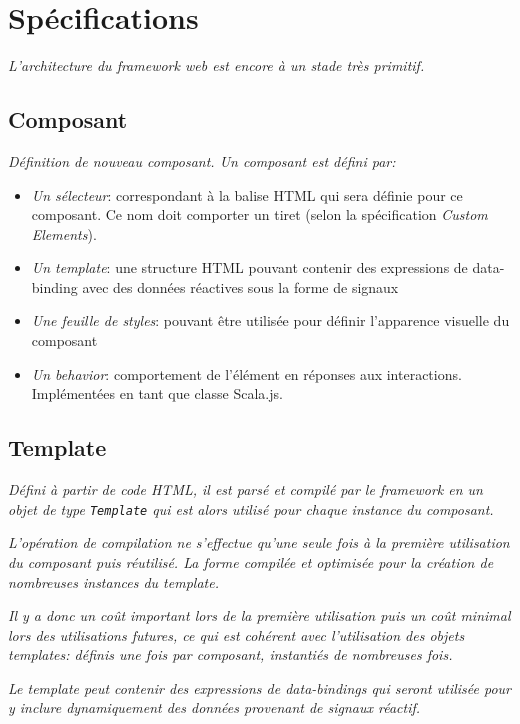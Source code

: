 \section{Spécifications} \label{sec:web-specs}

\textit{L'architecture du framework web est encore à un stade très primitif.}

\subsection{Composant}
\textit{Définition de nouveau composant. Un composant est défini par:}
\begin{itemize}
	\item \emph{Un sélecteur}: correspondant à la balise HTML qui sera définie pour ce composant. Ce nom doit comporter un tiret (selon la spécification \emph{Custom Elements}).
	\item \emph{Un template}: une structure HTML pouvant contenir des expressions de data-binding avec des données réactives sous la forme de signaux
	\item \emph{Une feuille de styles}: pouvant être utilisée pour définir l'apparence visuelle du composant
	\item \emph{Un behavior}: comportement de l'élément en réponses aux interactions. Implémentées en tant que classe Scala.js.
\end{itemize}

\subsection{Template}
\textit{Défini à partir de code HTML, il est parsé et compilé par le framework en un objet de type \texttt{Template} qui est alors utilisé pour chaque instance du composant.}

\textit{L'opération de compilation ne s'effectue qu'une seule fois à la première utilisation du composant puis réutilisé. La forme compilée et optimisée pour la création de nombreuses instances du template.}

\textit{Il y a donc un coût important lors de la première utilisation puis un coût minimal lors des utilisations futures, ce qui est cohérent avec l'utilisation des objets templates: définis une fois par composant, instantiés de nombreuses fois.}

\textit{Le template peut contenir des expressions de data-bindings qui seront utilisée pour y inclure dynamiquement des données provenant de signaux réactif.}

